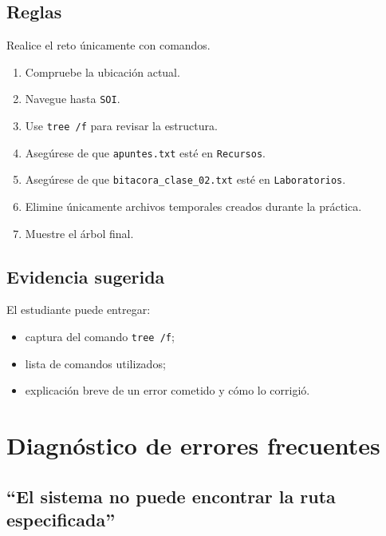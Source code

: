 \documentclass[
  spanish,
  letterpaper,
]{scrbook}
\providecommand{\tightlist}{%
  \setlength{\itemsep}{0pt}\setlength{\parskip}{0pt}}
\begin{document}
\section{Reglas}\label{reglas}

Realice el reto únicamente con comandos.

\begin{enumerate}
\def\labelenumi{\arabic{enumi}.}
\tightlist
\item
  Compruebe la ubicación actual.
\item
  Navegue hasta \texttt{SOI}.
\item
  Use \texttt{tree\ /f} para revisar la estructura.
\item
  Asegúrese de que \texttt{apuntes.txt} esté en \texttt{Recursos}.
\item
  Asegúrese de que \texttt{bitacora\_clase\_02.txt} esté en
  \texttt{Laboratorios}.
\item
  Elimine únicamente archivos temporales creados durante la práctica.
\item
  Muestre el árbol final.
\end{enumerate}

\section{Evidencia sugerida}\label{evidencia-sugerida}

El estudiante puede entregar:

\begin{itemize}
\tightlist
\item
  captura del comando \texttt{tree\ /f};
\item
  lista de comandos utilizados;
\item
  explicación breve de un error cometido y cómo lo corrigió.
\end{itemize}


\chapter{Diagnóstico de errores
frecuentes}\label{diagnuxf3stico-de-errores-frecuentes}

\section{``El sistema no puede encontrar la ruta
especificada''}\label{el-sistema-no-puede-encontrar-la-ruta-especificada}
\end{document}
